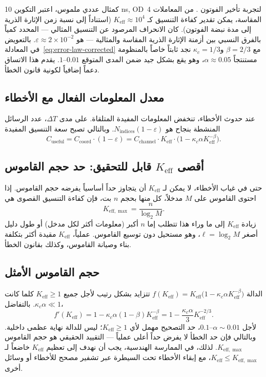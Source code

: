 \documentclass[12pt,a4paper]{article}
\newcommand{\Keff}{K_{\mathrm{eff}}}
\newcommand{\Keffmax}{K_{\mathrm{eff},\max}}
\theoremstyle{remark}
\begin{document}
	كمثال عددي ملموس، اعتبر التكوين 10 ns, OD~4 لتجربة تأخير الفوتون \cite{AppendixS}. من المعاملات المقاسة، يمكن تقدير كفاءة التنسيق كـ \(\Keff \approx 10^4\) (استناداً إلى نسبة زمن الإثارة الذرية إلى مدة نبضة الفوتون). كان الانحراف المرصود عن التنسيق المثالي — المحدد كمياً بالفرق النسبي بين أزمنة الإثارة الذرية المقاسة والمثالية — هو \(\varepsilon \approx 2\times 10^{-2}\). بالتعويض في المعادلة~\eqref{eq:error-law-corrected} مع \(\beta=2/3\) و\(\kappa_c=1/3\) نجد ثابتاً خاصاً بالمنظومة مستنتجاً \(\alpha \approx 0.05\)، وهو يقع بشكل جيد ضمن المدى المتوقع \(0.01\)–\(1\). يقدم هذا الاتساق دعماً إضافياً لكونية قانون الخطأ.
	
	\subsection{معدل المعلومات الفعال مع الأخطاء}
	
	عند حدوث الأخطاء، تنخفض المعلومات المفيدة المتلقاة. على مدى \(\Delta T\)، عدد الرسائل المنشطة بنجاح هو \(N_{\text{indices}}(1 - \varepsilon)\). وبالتالي تصبح سعة التنسيق المفيدة
	\begin{equation}
		C_{\text{useful}} = C_{\text{coord}} \cdot (1 - \varepsilon) = C_{\text{channel}} \cdot \Keff \cdot \bigl(1 - \kappa_c \alpha K_{\mathrm{eff}}^{-\beta}\bigr).
		\label{eq:useful-rate}
	\end{equation}
	
	\subsection{أقصى \(\Keff\) قابل للتحقيق: حد حجم القاموس}
	
	حتى في غياب الأخطاء، لا يمكن لـ \(\Keff\) أن يتجاوز حداً أساسياً يفرضه حجم القاموس. إذا احتوى القاموس على \(M\) مدخلاً، كل منها بحجم \(n\) بت، فإن كفاءة التنسيق القصوى هي
	\begin{equation}
		\Keffmax = \frac{n}{\log_2 M}. \label{eq:keff-max}
	\end{equation}
	زيادة \(\Keff\) إلى ما وراء هذا تتطلب إما \(n\) أكبر (معلومات أكثر لكل مدخل) أو طول دليل أصغر \(\ell = \log_2 M\)، وهو مستحيل دون توسيع القاموس. عملياً، \(\Keff\) مقيدة أكثر بتكلفة بناء وصيانة القاموس، وكذلك بقانون الخطأ.
	
	\subsection{حجم القاموس الأمثل}
	
	الدالة \(f(\Keff) = \Keff \bigl(1 - \kappa_c \alpha K_{\mathrm{eff}}^{-\beta}\bigr)\) تتزايد بشكل رتيب لأجل جميع \(\Keff \ge 1\) كلما كانت \(\kappa_c\alpha \ll 1\). بالتفاضل،
	\[
	f'(\Keff) = 1 - \kappa_c\alpha(1-\beta)K_{\mathrm{eff}}^{-\beta} = 1 - \frac{\kappa_c\alpha}{3} K_{\mathrm{eff}}^{-2/3}.
	\]
	لأجل \(\alpha \sim 0.01\)–\(0.1\)، حد التصحيح مهمل لأي \(\Keff \ge 1\)؛ ليس للدالة نهاية عظمى داخلية. وبالتالي فإن حد الخطأ لا يفرض حداً أعلى عملياً — التقييد الحقيقي هو حجم القاموس \(\Keffmax\). لذلك، في الممارسة الهندسية، يجب أن نهدف إلى تعظيم \(\Keff\) خاضعاً لـ \(\Keff \le \Keffmax\)، مع إبقاء الأخطاء تحت السيطرة عبر تشفير مصحح للأخطاء أو وسائل أخرى.
	
\end{document}
